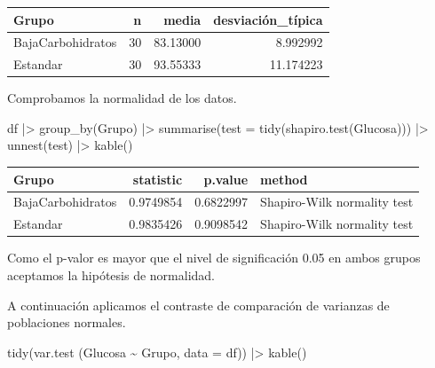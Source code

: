 \documentclass[
  spanish,
  a4paper,
]{scrreport}
\newenvironment{Shaded}{\begin{snugshade}}{\end{snugshade}}
\newcommand{\AttributeTok}[1]{\textcolor[rgb]{0.40,0.45,0.13}{#1}}
\newcommand{\FunctionTok}[1]{\textcolor[rgb]{0.28,0.35,0.67}{#1}}
\newcommand{\NormalTok}[1]{\textcolor[rgb]{0.00,0.23,0.31}{#1}}
\newcommand{\SpecialCharTok}[1]{\textcolor[rgb]{0.37,0.37,0.37}{#1}}
\newcounter{none} %
\theoremstyle{definition}
\theoremstyle{remark}
\begin{document}
\begin{tcolorbox}
{\def\LTcaptype{none} %
\begin{longtable}[]{@{}lrrr@{}}
\toprule\noalign{}
Grupo & n & media & desviación\_típica \\
\midrule\noalign{}
\endhead
\bottomrule\noalign{}
\endlastfoot
BajaCarbohidratos & 30 & 83.13000 & 8.992992 \\
Estandar & 30 & 93.55333 & 11.174223 \\
\end{longtable}
}

Comprobamos la normalidad de los datos.

\begin{Shaded}
\begin{Highlighting}[]
\NormalTok{df }\SpecialCharTok{|\textgreater{}} 
    \FunctionTok{group\_by}\NormalTok{(Grupo) }\SpecialCharTok{|\textgreater{}} 
    \FunctionTok{summarise}\NormalTok{(}\AttributeTok{test =} \FunctionTok{tidy}\NormalTok{(}\FunctionTok{shapiro.test}\NormalTok{(Glucosa))) }\SpecialCharTok{|\textgreater{}} 
    \FunctionTok{unnest}\NormalTok{(test) }\SpecialCharTok{|\textgreater{}} 
    \FunctionTok{kable}\NormalTok{()}
\end{Highlighting}
\end{Shaded}

{\def\LTcaptype{none} %
\begin{longtable}[]{@{}lrrl@{}}
\toprule\noalign{}
Grupo & statistic & p.value & method \\
\midrule\noalign{}
\endhead
\bottomrule\noalign{}
\endlastfoot
BajaCarbohidratos & 0.9749854 & 0.6822997 & Shapiro-Wilk normality
test \\
Estandar & 0.9835426 & 0.9098542 & Shapiro-Wilk normality test \\
\end{longtable}
}

Como el p-valor es mayor que el nivel de significación 0.05 en ambos
grupos aceptamos la hipótesis de normalidad.

A continuación aplicamos el contraste de comparación de varianzas de
poblaciones normales.

\begin{Shaded}
\begin{Highlighting}[]
\FunctionTok{tidy}\NormalTok{(}\FunctionTok{var.test}\NormalTok{ (Glucosa }\SpecialCharTok{\textasciitilde{}}\NormalTok{ Grupo, }\AttributeTok{data =}\NormalTok{ df)) }\SpecialCharTok{|\textgreater{}} 
    \FunctionTok{kable}\NormalTok{()}
\end{Highlighting}
\end{Shaded}


\end{tcolorbox}
\end{document}
